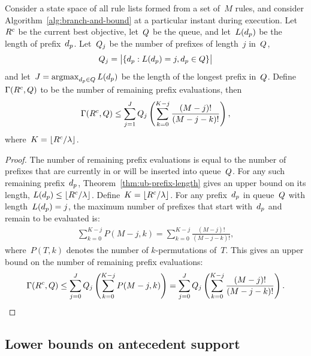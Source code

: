 \begin{proposition}
\label{thm:remaining-eval-coarse}
Consider a state space of all rule lists formed from a set of~$M$ rules,
and consider Algorithm~\ref{alg:branch-and-bound} at a particular instant
during execution.
%
Let~${R^c}$ be the current best objective, let~$Q$ be the queue,
and let~$L(d_p)$ be the length of prefix~$d_p$.
%
Let~$Q_j$ be the number of prefixes of length~$j$ in~$Q$,
\begin{align}
\Queue_j = \big | \{ \Prefix : L(\Prefix) = j, \Prefix \in \Queue \} \big |
\end{align}
and let~${J = \operatorname*{argmax}_{d_p \in Q} L(d_p)}$
be the length of the longest prefix in~$Q$.
%
Define~${\Gamma({R^c}, Q)}$ to be the number of remaining
prefix evaluations, then
\begin{align}
\Remaining(\CurrentObj, \Queue)
\le \sum_{j=1}^J \Queue_j \left( \sum_{k=0}^{K-j} \frac{(M-j)!}{(M-j - k)!} \right),
\end{align}
where~${K = \lfloor {R^c} / {\lambda} \rfloor}$.
\end{proposition}

\begin{proof}
The number of remaining prefix evaluations is equal to the number of
prefixes that are currently in or will be inserted into queue~$Q$.
%
For any such remaining prefix~$d_p$,
Theorem~\ref{thm:ub-prefix-length} gives an upper bound on its length,
${L(d_p) \le \lfloor {R^c} / {\lambda} \rfloor}$.
%
Define~${K = \lfloor {R^c} / {\lambda} \rfloor}$.
%
For any prefix~$d_p$ in queue~$Q$ with length~${L(d_p) = j}$,
the maximum number of prefixes that start with~$d_p$
and remain to be evaluated is:
\begin{align}
\sum_{k=0}^{K-j} P(M-j, k) = \sum_{k=0}^{K-j} \frac{(M-j)!}{(M-j - k)!},
\end{align}
where~${P(T, k)}$ denotes the number of $k$-permutations of~$T$.
%
This gives an upper bound on the number of remaining prefix evaluations:
\begin{align}
\Remaining(\CurrentObj, \Queue)
\le \sum_{j=0}^J \Queue_j \left( \sum_{k=0}^{K-j} P(M-j, k) \right)
= \sum_{j=0}^J \Queue_j \left( \sum_{k=0}^{K-j} \frac{(M-j)!}{(M-j - k)!} \right).
\end{align}
\end{proof}

\subsection{Lower bounds on antecedent support}
\label{sec:lb-support}

